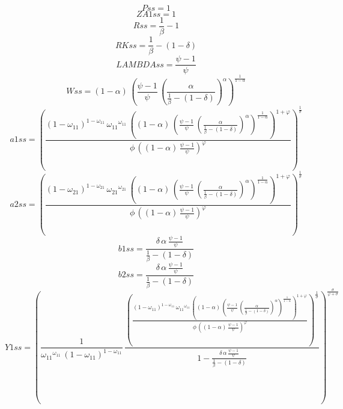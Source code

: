 \begin{dmath*}
Pss = 1
\end{dmath*}
\begin{dmath*}
ZA1ss = 1
\end{dmath*}
\begin{dmath*}
Rss = \frac{1}{{{\beta}}}-1
\end{dmath*}
\begin{dmath*}
RKss = \frac{1}{{{\beta}}}-\left(1-{{\delta}}\right)
\end{dmath*}
\begin{dmath*}
LAMBDAss = \frac{{{\psi}}-1}{{{\psi}}}
\end{dmath*}
\begin{dmath*}
Wss = \left(1-{{\alpha}}\right)\, \left(\frac{{{\psi}}-1}{{{\psi}}}\, \left(\frac{{{\alpha}}}{\frac{1}{{{\beta}}}-\left(1-{{\delta}}\right)}\right)^{{{\alpha}}}\right)^{\frac{1}{1-{{\alpha}}}}
\end{dmath*}
\begin{dmath*}
a1ss = \left(\frac{\left(1-{{\omega_{11}}}\right)^{1-{{\omega_{11}}}}\, {{\omega_{11}}}^{{{\omega_{11}}}}\, \left(\left(1-{{\alpha}}\right)\, \left(\frac{{{\psi}}-1}{{{\psi}}}\, \left(\frac{{{\alpha}}}{\frac{1}{{{\beta}}}-\left(1-{{\delta}}\right)}\right)^{{{\alpha}}}\right)^{\frac{1}{1-{{\alpha}}}}\right)^{1+{{\varphi}}}}{{{\phi}}\, \left(\left(1-{{\alpha}}\right)\, \frac{{{\psi}}-1}{{{\psi}}}\right)^{{{\varphi}}}}\right)^{\frac{1}{{{\sigma}}}}
\end{dmath*}
\begin{dmath*}
a2ss = \left(\frac{\left(1-{{\omega_{21}}}\right)^{1-{{\omega_{21}}}}\, {{\omega_{21}}}^{{{\omega_{21}}}}\, \left(\left(1-{{\alpha}}\right)\, \left(\frac{{{\psi}}-1}{{{\psi}}}\, \left(\frac{{{\alpha}}}{\frac{1}{{{\beta}}}-\left(1-{{\delta}}\right)}\right)^{{{\alpha}}}\right)^{\frac{1}{1-{{\alpha}}}}\right)^{1+{{\varphi}}}}{{{\phi}}\, \left(\left(1-{{\alpha}}\right)\, \frac{{{\psi}}-1}{{{\psi}}}\right)^{{{\varphi}}}}\right)^{\frac{1}{{{\sigma}}}}
\end{dmath*}
\begin{dmath*}
b1ss = \frac{{{\delta}}\, {{\alpha}}\, \frac{{{\psi}}-1}{{{\psi}}}}{\frac{1}{{{\beta}}}-\left(1-{{\delta}}\right)}
\end{dmath*}
\begin{dmath*}
b2ss = \frac{{{\delta}}\, {{\alpha}}\, \frac{{{\psi}}-1}{{{\psi}}}}{\frac{1}{{{\beta}}}-\left(1-{{\delta}}\right)}
\end{dmath*}
\begin{dmath*}
Y1ss = \left(\frac{1}{{{\omega_{11}}}^{{{\omega_{11}}}}\, \left(1-{{\omega_{11}}}\right)^{1-{{\omega_{11}}}}}\, \frac{\left(\frac{\left(1-{{\omega_{11}}}\right)^{1-{{\omega_{11}}}}\, {{\omega_{11}}}^{{{\omega_{11}}}}\, \left(\left(1-{{\alpha}}\right)\, \left(\frac{{{\psi}}-1}{{{\psi}}}\, \left(\frac{{{\alpha}}}{\frac{1}{{{\beta}}}-\left(1-{{\delta}}\right)}\right)^{{{\alpha}}}\right)^{\frac{1}{1-{{\alpha}}}}\right)^{1+{{\varphi}}}}{{{\phi}}\, \left(\left(1-{{\alpha}}\right)\, \frac{{{\psi}}-1}{{{\psi}}}\right)^{{{\varphi}}}}\right)^{\frac{1}{{{\sigma}}}}}{1-\frac{{{\delta}}\, {{\alpha}}\, \frac{{{\psi}}-1}{{{\psi}}}}{\frac{1}{{{\beta}}}-\left(1-{{\delta}}\right)}}\right)^{\frac{{{\sigma}}}{{{\varphi}}+{{\sigma}}}}
\end{dmath*}
